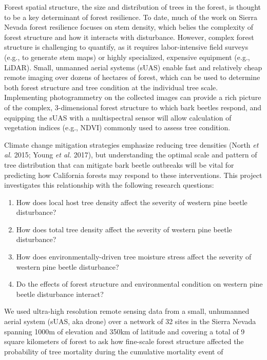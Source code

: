 \documentclass[]{article}
\begin{document}
Forest spatial structure, the size and distribution of trees in the
forest, is thought to be a key determinant of forest resilience. To
date, much of the work on Sierra Nevada forest resilience focuses on
stem density, which belies the complexity of forest structure and how it
interacts with disturbance. However, complex forest structure is
challenging to quantify, as it requires labor-intensive field surveys
(e.g., to generate stem maps) or highly specialized, expensive equipment
(e.g., LiDAR). Small, unmanned aerial systems (sUAS) enable fast and
relatively cheap remote imaging over dozens of hectares of forest, which
can be used to determine both forest structure and tree condition at the
individual tree scale. Implementing photogrammetry on the collected
images can provide a rich picture of the complex, 3-dimensional forest
structure to which bark beetles respond, and equipping the sUAS with a
multispectral sensor will allow calculation of vegetation indices (e.g.,
NDVI) commonly used to assess tree condition.

Climate change mitigation strategies emphasize reducing tree densities
(North \emph{et al.} 2015; Young \emph{et al.} 2017), but understanding
the optimal scale and pattern of tree distribution that can mitigate
bark beetle outbreaks will be vital for predicting how California
forests may respond to these interventions. This project investigates
this relationship with the following research questions:

\begin{enumerate}
\def\labelenumi{\arabic{enumi}.}
\item
  How does local host tree density affect the severity of western pine
  beetle disturbance?
\item
  How does total tree density affect the severity of western pine beetle
  disturbance?
\item
  How does environmentally-driven tree moisture stress affect the
  severity of western pine beetle disturbance?
\item
  Do the effects of forest structure and environmental condition on
  western pine beetle disturbance interact?
\end{enumerate}

We used ultra-high resolution remote sensing data from a small,
unhumanned aerial system (sUAS, aka drone) over a network of 32 sites in
the Sierra Nevada spanning 1000m of elevation and 350km of latitude and
covering a total of 9 square kilometers of forest to ask how fine-scale
forest structure affected the probability of tree mortality during the
cumulative mortality event of
\end{document}
